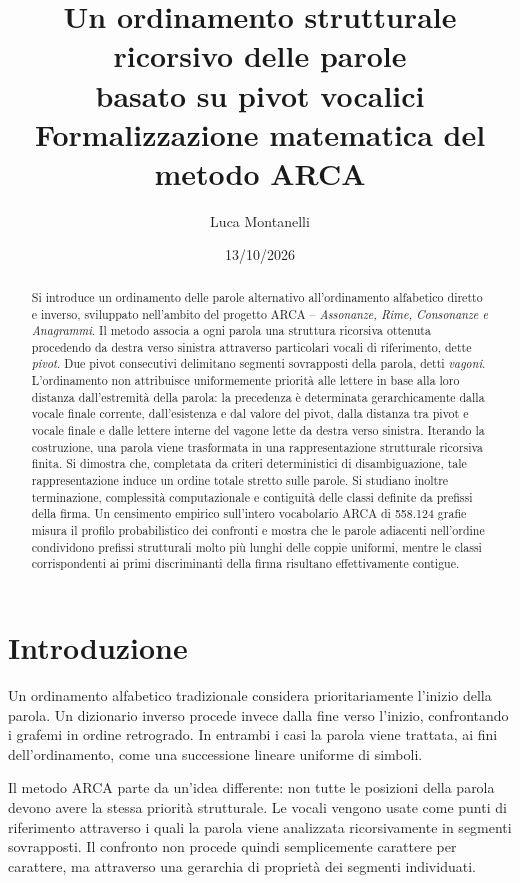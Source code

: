 \documentclass[11pt,a4paper]{article}
\title{\textbf{Un ordinamento strutturale ricorsivo delle parole\\basato su pivot vocalici}\\[0.5em]
\large Formalizzazione matematica del metodo ARCA}
\author{Luca Montanelli}
\date{13/10/2026}
\theoremstyle{definition}
\theoremstyle{remark}
\begin{document}
\maketitle

\begin{abstract}
Si introduce un ordinamento delle parole alternativo all'ordinamento alfabetico diretto e inverso, sviluppato nell'ambito del progetto ARCA -- \emph{Assonanze, Rime, Consonanze e Anagrammi}. Il metodo associa a ogni parola una struttura ricorsiva ottenuta procedendo da destra verso sinistra attraverso particolari vocali di riferimento, dette \emph{pivot}. Due pivot consecutivi delimitano segmenti sovrapposti della parola, detti \emph{vagoni}. L'ordinamento non attribuisce uniformemente priorità alle lettere in base alla loro distanza dall'estremità della parola: la precedenza è determinata gerarchicamente dalla vocale finale corrente, dall'esistenza e dal valore del pivot, dalla distanza tra pivot e vocale finale e dalle lettere interne del vagone lette da destra verso sinistra. Iterando la costruzione, una parola viene trasformata in una rappresentazione strutturale ricorsiva finita. Si dimostra che, completata da criteri deterministici di disambiguazione, tale rappresentazione induce un ordine totale stretto sulle parole. Si studiano inoltre terminazione, complessità computazionale e contiguità delle classi definite da prefissi della firma. Un censimento empirico sull'intero vocabolario ARCA di 558.124 grafie misura il profilo probabilistico dei confronti e mostra che le parole adiacenti nell'ordine condividono prefissi strutturali molto più lunghi delle coppie uniformi, mentre le classi corrispondenti ai primi discriminanti della firma risultano effettivamente contigue.
\end{abstract}

\section{Introduzione}

Un ordinamento alfabetico tradizionale considera prioritariamente l'inizio della parola. Un dizionario inverso procede invece dalla fine verso l'inizio, confrontando i grafemi in ordine retrogrado. In entrambi i casi la parola viene trattata, ai fini dell'ordinamento, come una successione lineare uniforme di simboli.

Il metodo ARCA parte da un'idea differente: non tutte le posizioni della parola devono avere la stessa priorità strutturale. Le vocali vengono usate come punti di riferimento attraverso i quali la parola viene analizzata ricorsivamente in segmenti sovrapposti. Il confronto non procede quindi semplicemente carattere per carattere, ma attraverso una gerarchia di proprietà dei segmenti individuati.
\end{document}
